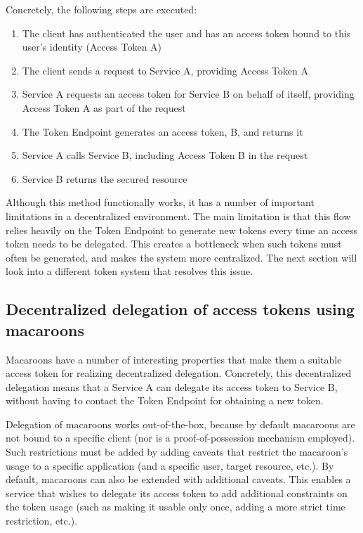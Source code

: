 \noindent Concretely, the following steps are executed:
\begin{enumerate}
    \item The client has authenticated the user and has an access token bound to this user's identity (Access Token A)
    \item The client sends a request to Service A, providing Access Token A
    \item Service A requests an access token for Service B on behalf of itself, providing Access Token A as part of the request
    \item The Token Endpoint generates an access token, B, and returns it
    \item Service A calls Service B, including Access Token B in the request
    \item Service B returns the secured resource
\end{enumerate}
\noindent Although this method functionally works, it has a number of important limitations in a decentralized environment. The main limitation is that this flow relies heavily on the Token Endpoint to generate new tokens every time an access token needs to be delegated. This creates a bottleneck when such tokens must often be generated, and makes the system more centralized. The next section will look into a different token system that resolves this issue.

\subsection{Decentralized delegation of access tokens using macaroons}
Macaroons have a number of interesting properties that make them a suitable access token for realizing decentralized delegation. Concretely, this decentralized delegation means that a Service A can delegate its access token to Service B, without having to contact the Token Endpoint for obtaining a new token.

Delegation of macaroons works out-of-the-box, because by default macaroons are not bound to a specific client (nor is a proof-of-possession mechanism employed). Such restrictions must be added by adding caveats that restrict the macaroon's usage to a specific application (and a specific user, target resource, etc.). By default, macaroons can also be extended with additional caveats. This enables a service that wishes to delegate its access token to add additional constraints on the token usage (such as making it usable only once, adding a more strict time restriction, etc.).


